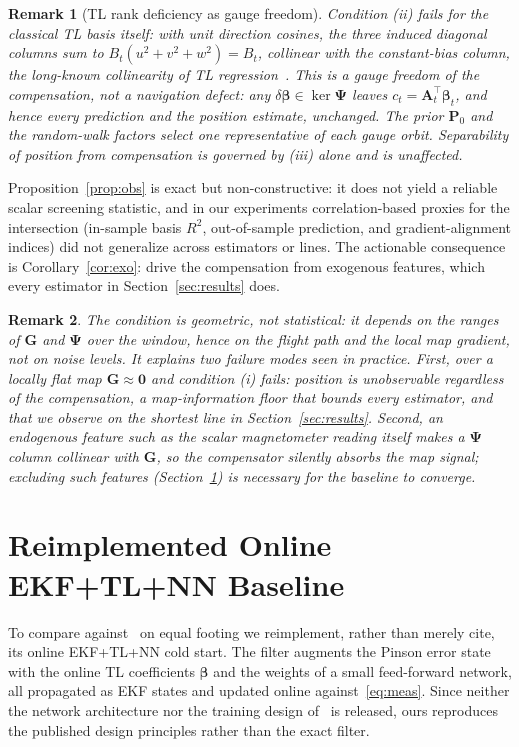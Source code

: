 \documentclass{IEEEtaes}
\newtheorem{remark}{Remark}
\begin{document}
\begin{remark}[TL rank deficiency as gauge freedom]\label{rem:gauge}
Condition (ii) fails for the classical TL basis itself: with unit direction
cosines, the three induced diagonal columns sum to
$B_t(u^2{+}v^2{+}w^2)=B_t$, collinear with the constant-bias column, the
long-known collinearity of TL regression~\cite{leliak1961,noriega2015}. This is a
gauge freedom of the compensation, not a navigation defect: any
$\delta\boldsymbol{\beta}\in\ker\boldsymbol{\Psi}$ leaves
$c_t=\mathbf{A}_t^{\top}\boldsymbol{\beta}_t$, and hence every prediction and the
position estimate, unchanged. The prior $\mathbf{P}_0$ and the random-walk factors
select one representative of each gauge orbit. Separability of position from
compensation is governed by (iii) alone and is unaffected.
\end{remark}

Proposition~\ref{prop:obs} is exact but non-constructive: it does not yield a
reliable scalar screening statistic, and in our experiments correlation-based
proxies for the intersection (in-sample basis $R^2$, out-of-sample prediction, and
gradient-alignment indices) did not generalize across estimators or lines. The
actionable consequence is Corollary~\ref{cor:exo}: drive the compensation from
exogenous features, which every estimator in Section~\ref{sec:results} does.

\begin{remark}
The condition is geometric, not statistical: it depends on the ranges of
$\mathbf{G}$ and $\boldsymbol{\Psi}$ over the window, hence on the flight path and
the local map gradient, not on noise levels. It explains two failure modes seen in
practice. First, over a locally flat map $\mathbf{G}\!\approx\!\mathbf{0}$ and
condition (i) fails: position is unobservable regardless of the
compensation, a map-information floor that bounds every estimator, and that we
observe on the shortest line in Section~\ref{sec:results}. Second, an endogenous feature such as the scalar
magnetometer reading itself makes a $\boldsymbol{\Psi}$ column collinear with
$\mathbf{G}$, so the compensator silently absorbs the map signal; excluding such
features (Section~\ref{sec:baseline}) is necessary for the baseline to converge.
\end{remark}

\section{Reimplemented Online EKF+TL+NN Baseline}\label{sec:baseline}
To compare against~\cite{hager2026} on equal footing we reimplement, rather than
merely cite, its online EKF+TL+NN cold start. The filter augments the Pinson error
state with the online TL coefficients $\boldsymbol{\beta}$ and the weights of a
small feed-forward network, all propagated as EKF states and updated online
against~\eqref{eq:meas}. Since neither the network architecture nor the training
design of~\cite{hager2026} is released, ours reproduces the published design
principles rather than the exact filter.
\end{document}
